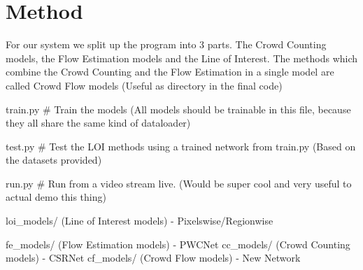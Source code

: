 \chapter{Method}
For our system we split up the program into 3 parts. The Crowd Counting models, the Flow Estimation models and the Line of Interest. The methods which combine the Crowd Counting and the Flow Estimation in a single model are called Crowd Flow models (Useful as directory in the final code)

train.py \# Train the models (All models should be trainable in this file, because they all share the same kind of dataloader)

test.py \# Test the LOI methods using a trained network from train.py (Based on the datasets provided)

run.py \# Run from a video stream live. (Would be super cool and very useful to actual demo this thing)

loi\_models/ (Line of Interest models) - Pixelswise/Regionwise

fe\_models/ (Flow Estimation models) - PWCNet
cc\_models/ (Crowd Counting models) - CSRNet
cf\_models/ (Crowd Flow models) - New Network